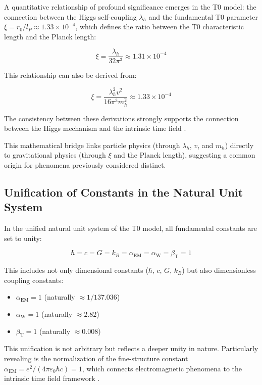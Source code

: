 \documentclass[12pt,a4paper]{article}
\newcommand{\alphaEM}{\alpha_{\text{EM}}}
\newcommand{\alphaW}{\alpha_{\text{W}}}
\newcommand{\betaT}{\beta_{\text{T}}}
\begin{document}
	A quantitative relationship of profound significance emerges in the T0 model: the connection between the Higgs self-coupling $\lambda_h$ and the fundamental T0 parameter $\xi = r_0/l_P \approx 1.33 \times 10^{-4}$, which defines the ratio between the T0 characteristic length and the Planck length:
	
	\begin{equation}
		\xi = \frac{\lambda_h}{32\pi^3} \approx 1.31 \times 10^{-4}
	\end{equation}
	
	This relationship can also be derived from:
	
	\begin{equation}
		\xi = \frac{\lambda_h^2 v^2}{16\pi^3 m_h^2} \approx 1.33 \times 10^{-4}
	\end{equation}
	
	The consistency between these derivations strongly supports the connection between the Higgs mechanism and the intrinsic time field \cite{pascher_alphabeta_2025}.
	
	This mathematical bridge links particle physics (through $\lambda_h$, $v$, and $m_h$) directly to gravitational physics (through $\xi$ and the Planck length), suggesting a common origin for phenomena previously considered distinct.
	
	\subsection{Unification of Constants in the Natural Unit System}
	\label{subsec:unified_constants}
	
	In the unified natural unit system of the T0 model, all fundamental constants are set to unity:
	
	\begin{equation}
		\hbar = c = G = k_B = \alphaEM = \alphaW = \betaT = 1
	\end{equation}
	
	This includes not only dimensional constants ($\hbar$, $c$, $G$, $k_B$) but also dimensionless coupling constants:
	
	\begin{itemize}
		\item $\alphaEM = 1$ (naturally $\approx 1/137.036$)
		\item $\alphaW = 1$ (naturally $\approx 2.82$)
		\item $\betaT = 1$ (naturally $\approx 0.008$)
	\end{itemize}
	
	This unification is not arbitrary but reflects a deeper unity in nature. Particularly revealing is the normalization of the fine-structure constant $\alphaEM = e^2/(4\pi\varepsilon_0\hbar c) = 1$, which connects electromagnetic phenomena to the intrinsic time field framework \cite{pascher_alpha_2025}.
	
\end{document}

